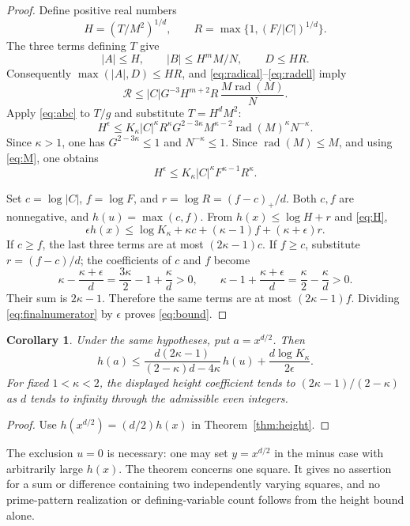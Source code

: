 \documentclass[11pt,a4paper]{article}
\newtheorem{corollary}[theorem]{Corollary}
\DeclareMathOperator{\rad}{rad}
\begin{document}
\begin{proof}
Define positive real numbers
\[
 H=(T/M^2)^{1/d},\qquad
 R=\max\{1,(F/|C|)^{1/d}\}.
\]
The three terms defining $T$ give
\[
 |A|\le H,\qquad |B|\le H^mM/N,\qquad D\le HR.
\]
Consequently $\max(|A|,D)\le HR$, and
\eqref{eq:radical}--\eqref{eq:radell} imply
\[
 \mathcal R\le
 |C|G^{-3} H^{m+2}R\,\frac{M\rad(M)}N.
\]
Apply \eqref{eq:abc} to $T/g$ and substitute $T=H^dM^2$:
\[
 H^\epsilon\le
 K_\kappa |C|^\kappa R^\kappa
 G^{2-3\kappa}M^{\kappa-2}\rad(M)^\kappa N^{-\kappa}.
\]
Since $\kappa>1$, one has $G^{2-3\kappa}\le1$ and
$N^{-\kappa}\le1$. Since $\rad(M)\le M$, and using
\eqref{eq:M}, one obtains
\begin{equation}\label{eq:H}
 H^\epsilon\le
 K_\kappa |C|^\kappa F^{\kappa-1}R^\kappa.
\end{equation}

Set $c=\log|C|$, $f=\log F$, and
$r=\log R=(f-c)_+/d$. Both $c,f$ are nonnegative, and
$h(u)=\max(c,f)$. From $h(x)\le\log H+r$ and
\eqref{eq:H},
\begin{equation}\label{eq:finalnumerator}
 \epsilon h(x)\le
 \log K_\kappa+\kappa c+(\kappa-1)f+(\kappa+\epsilon)r.
\end{equation}
If $c\ge f$, the last three terms are at most
$(2\kappa-1)c$. If $f\ge c$, substitute $r=(f-c)/d$;
the coefficients of $c$ and $f$ become
\[
 \kappa-\frac{\kappa+\epsilon}{d}
   =\frac{3\kappa}{2}-1+\frac\kappa d>0,
 \qquad
 \kappa-1+\frac{\kappa+\epsilon}{d}
   =\frac\kappa2-\frac\kappa d>0.
\]
Their sum is $2\kappa-1$. Therefore the same terms are at most
$(2\kappa-1)f$. Dividing \eqref{eq:finalnumerator} by
$\epsilon$ proves \eqref{eq:bound}.
\end{proof}

\begin{corollary}\label{cor:powered}
Under the same hypotheses, put $a=x^{d/2}$. Then
\[
 h(a)\le
 \frac{d(2\kappa-1)}{(2-\kappa)d-4\kappa}\,h(u)
 +\frac{d\log K_\kappa}{2\epsilon}.
\]
For fixed $1<\kappa<2$, the displayed height coefficient tends to
$(2\kappa-1)/(2-\kappa)$ as $d$ tends to infinity through the
admissible even integers.
\end{corollary}
\begin{proof}
Use $h(x^{d/2})=(d/2)h(x)$ in Theorem~\ref{thm:height}.
\end{proof}

The exclusion $u=0$ is necessary: one may set
$y=x^{d/2}$ in the minus case with arbitrarily large $h(x)$.
The theorem concerns one square. It gives no assertion for a sum or
difference containing two independently varying squares, and no
prime-pattern realization or defining-variable count follows from
the height bound alone.
\end{document}
